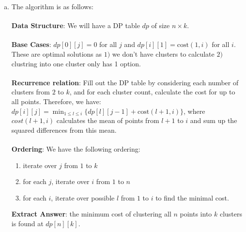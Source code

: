 \documentclass[10pt]{article}
\begin{document}
\begin{solution}
\begin{enumerate} [(a)]
        \item The algorithm is as follows: \\\\
        \textbf{Data Structure}: We will have a DP table $dp$ of size $n \times k$. \\ \\
        \textbf{Base Cases}: $dp[0][j] = 0$ for all $j$ and $dp[i][1] = \text{cost}(1, i)$ for all $i$. These are optimal solutions as $1)$ we don't have clusters to calculate $2)$ clustring into one cluster only has 1 option. \\\\
        \textbf{Recurrence relation}: Fill out the DP table by considering each number of clusters from $2$ to $k$, and for each cluster count, calculate the cost for up to all points. Therefore, we have: \\
        $dp[i][j] = \min_{1 \leq l \leq i} \{dp[l][j-1] + \text{cost}(l+1, i)\}$, where $cost(l+1, i)$ calculates the mean of points from $l+1$ to $i$ and sum up the squared differences from this mean. \\\\
        \textbf{Ordering}: We have the following ordering:
            \begin{enumerate} [(1)]
                \item iterate over $j$ from $1$ to $k$
                \item for each $j$, iterate over $i$ from $1$ to $n$
                \item for each $i$, iterate over possible $l$ from $1$ to $i$ to find the minimal cost. 
            \end{enumerate}
        \textbf{Extract Answer}: the minimum cost of clustering all $n$ points into $k$ clusters is found at $dp[n][k]$. \\\\
    \end{enumerate}
\end{solution}

\newpage

   
\end{document}
